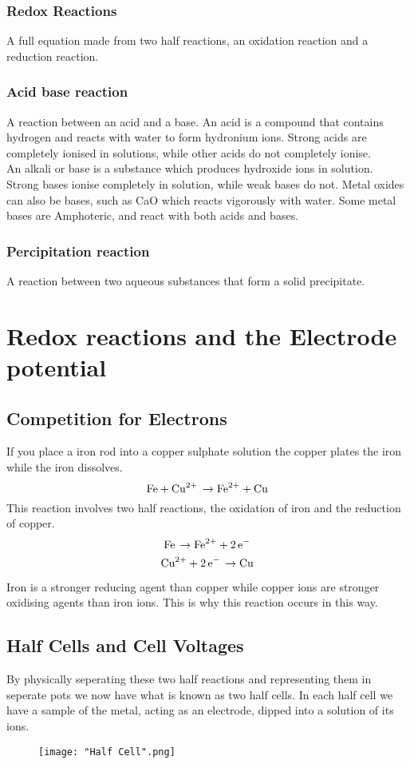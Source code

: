 \documentclass[a4paper, 12pt]{article}
\begin{document}
		\subsubsection*{Redox Reactions}
			A full equation made from two half reactions, an oxidation reaction and a reduction reaction.
		\subsubsection*{Acid base reaction}
			A reaction between an acid and a base. An acid is a compound that contains hydrogen and reacts with water to form hydronium ions. Strong acids are completely ionised in solutions, while other acids do not completely ionise. \\
			An alkali or base is a substance which produces hydroxide ions in solution. Strong bases ionise completely in solution, while weak bases do not. Metal oxides can also be bases, such as CaO which reacts vigorously with water. Some metal bases are Amphoteric, and react with both acids and bases.
		
		\subsubsection*{Percipitation reaction}
			A reaction between two aqueous substances that form a solid precipitate.
\newpage

\section{Redox reactions and the Electrode potential}
	\subsection{Competition for Electrons}
		If you place a iron rod into a copper sulphate solution the copper plates the iron while the iron dissolves. 
		\[\ce{Fe + Cu^2+ \rightarrow Fe^2+ + Cu}\]
		This reaction involves two half reactions, the oxidation of iron and the reduction of copper.
		\[ \ce{Fe \rightarrow Fe^2+ +2e-} \]
		\[ \ce{Cu^2+ + 2e- \rightarrow Cu} \]

		Iron is a stronger reducing agent than copper while copper ions are stronger oxidising agents than iron ions. This is why this reaction occurs in this way. 
	
	\subsection{Half Cells and Cell Voltages}
		By physically seperating these two half reactions and representing them in seperate pots we now have what is known as two half cells. In each half cell we have a sample of the metal, acting as an electrode, dipped into a solution of its ions. 
		\begin{figure}[!h]
			\centering
			\texttt{[image: "Half Cell".png]}
		\end{figure}
		
\end{document}
